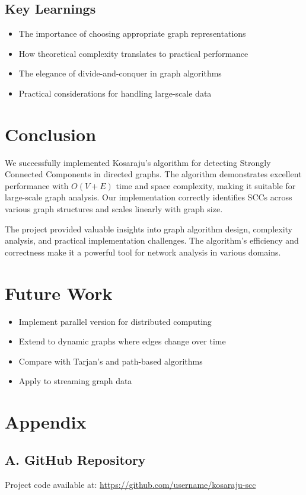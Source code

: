 \documentclass[12pt]{article}
\begin{document}
\subsection{Key Learnings}

\begin{itemize}
    \item The importance of choosing appropriate graph representations
    \item How theoretical complexity translates to practical performance
    \item The elegance of divide-and-conquer in graph algorithms
    \item Practical considerations for handling large-scale data
\end{itemize}

\section{Conclusion}
We successfully implemented Kosaraju's algorithm for detecting Strongly Connected Components in directed graphs. The algorithm demonstrates excellent performance with $O(V + E)$ time and space complexity, making it suitable for large-scale graph analysis. Our implementation correctly identifies SCCs across various graph structures and scales linearly with graph size.

The project provided valuable insights into graph algorithm design, complexity analysis, and practical implementation challenges. The algorithm's efficiency and correctness make it a powerful tool for network analysis in various domains.

\section{Future Work}
\begin{itemize}
    \item Implement parallel version for distributed computing
    \item Extend to dynamic graphs where edges change over time
    \item Compare with Tarjan's and path-based algorithms
    \item Apply to streaming graph data
\end{itemize}

\section*{Appendix}
\subsection*{A. GitHub Repository}
Project code available at: \url{https://github.com/username/kosaraju-scc}
\end{document}
